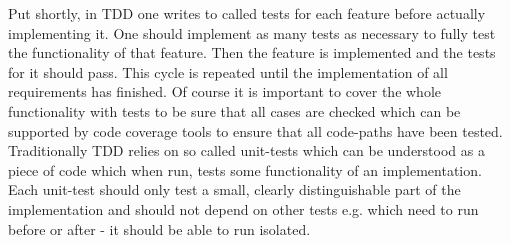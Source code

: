 Put shortly, in TDD one writes to called tests for each feature before actually implementing it. One should implement as many tests as necessary to fully test the functionality of that feature. Then the feature is implemented and the tests for it should pass. This cycle is repeated until the implementation of all requirements has finished. Of course it is important to cover the whole functionality with tests to be sure that all cases are checked which can be supported by code coverage tools to ensure that all code-paths have been tested. Traditionally TDD relies on so called unit-tests which can be understood as a piece of code which when run, tests some functionality of an implementation. Each unit-test should only test a small, clearly distinguishable part of the implementation and should not depend on other tests e.g. which need to run before or after - it should be able to run isolated.



